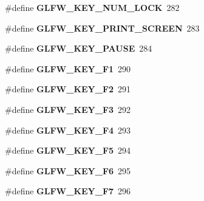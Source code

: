 \begin{DoxyCompactItemize}
\item 
\hypertarget{group__keys_ga3946edc362aeff213b2be6304296cf43}{\#define {\bfseries \-G\-L\-F\-W\-\_\-\-K\-E\-Y\-\_\-\-N\-U\-M\-\_\-\-L\-O\-C\-K}~282}\label{group__keys_ga3946edc362aeff213b2be6304296cf43}

\item 
\hypertarget{group__keys_gaf964c2e65e97d0cf785a5636ee8df642}{\#define {\bfseries \-G\-L\-F\-W\-\_\-\-K\-E\-Y\-\_\-\-P\-R\-I\-N\-T\-\_\-\-S\-C\-R\-E\-E\-N}~283}\label{group__keys_gaf964c2e65e97d0cf785a5636ee8df642}

\item 
\hypertarget{group__keys_ga8116b9692d87382afb5849b6d8907f18}{\#define {\bfseries \-G\-L\-F\-W\-\_\-\-K\-E\-Y\-\_\-\-P\-A\-U\-S\-E}~284}\label{group__keys_ga8116b9692d87382afb5849b6d8907f18}

\item 
\hypertarget{group__keys_gafb8d66c573acf22e364049477dcbea30}{\#define {\bfseries \-G\-L\-F\-W\-\_\-\-K\-E\-Y\-\_\-\-F1}~290}\label{group__keys_gafb8d66c573acf22e364049477dcbea30}

\item 
\hypertarget{group__keys_ga0900750aff94889b940f5e428c07daee}{\#define {\bfseries \-G\-L\-F\-W\-\_\-\-K\-E\-Y\-\_\-\-F2}~291}\label{group__keys_ga0900750aff94889b940f5e428c07daee}

\item 
\hypertarget{group__keys_gaed7cd729c0147a551bb8b7bb36c17015}{\#define {\bfseries \-G\-L\-F\-W\-\_\-\-K\-E\-Y\-\_\-\-F3}~292}\label{group__keys_gaed7cd729c0147a551bb8b7bb36c17015}

\item 
\hypertarget{group__keys_ga9b61ebd0c63b44b7332fda2c9763eaa6}{\#define {\bfseries \-G\-L\-F\-W\-\_\-\-K\-E\-Y\-\_\-\-F4}~293}\label{group__keys_ga9b61ebd0c63b44b7332fda2c9763eaa6}

\item 
\hypertarget{group__keys_gaf258dda9947daa428377938ed577c8c2}{\#define {\bfseries \-G\-L\-F\-W\-\_\-\-K\-E\-Y\-\_\-\-F5}~294}\label{group__keys_gaf258dda9947daa428377938ed577c8c2}

\item 
\hypertarget{group__keys_ga6dc2d3f87b9d51ffbbbe2ef0299d8e1d}{\#define {\bfseries \-G\-L\-F\-W\-\_\-\-K\-E\-Y\-\_\-\-F6}~295}\label{group__keys_ga6dc2d3f87b9d51ffbbbe2ef0299d8e1d}

\item 
\hypertarget{group__keys_gacca6ef8a2162c52a0ac1d881e8d9c38a}{\#define {\bfseries \-G\-L\-F\-W\-\_\-\-K\-E\-Y\-\_\-\-F7}~296}\label{group__keys_gacca6ef8a2162c52a0ac1d881e8d9c38a}


\end{DoxyCompactItemize}
